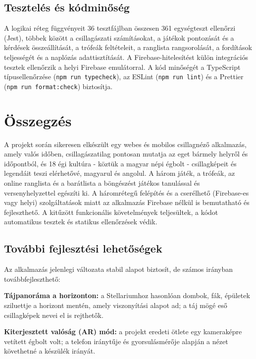 \documentclass[12pt,a4paper]{article}
\newcommand{\kod}[1]{\texttt{\small #1}}
\begin{document}
\subsection{Tesztelés és kódminőség}

A logikai réteg függvényeit 36 tesztfájlban összesen 361 egységteszt ellenőrzi (Jest), többek
között a csillagászati számításokat, a játékok pontozását és a kérdések összeállítását, a
trófeák feltételeit, a ranglista rangsorolását, a fordítások teljességét és a naplózás
adattisztítását. A Firebase-hitelesítést külön integrációs tesztek ellenőrzik a helyi Firebase
emulátorral. A kód minőségét a TypeScript típusellenőrzése (\kod{npm run typecheck}), az ESLint
(\kod{npm run lint}) és a Prettier (\kod{npm run format:check}) biztosítja.

\section{Összegzés}

A projekt során sikeresen elkészült egy webes és mobilos csillagnéző alkalmazás, amely
valós időben, csillagászatilag pontosan mutatja az eget bármely helyről és időpontból, és 18 égi
kultúra - köztük a magyar népi égbolt - csillagképeit és legendáit teszi elérhetővé, magyarul
és angolul. A három játék, a trófeák, az online ranglista és a barátlista a böngészést játékos
tanulással és versenyhelyzettel egészíti ki. A háromrétegű felépítés és a cserélhető
(Firebase-es vagy helyi) szolgáltatások miatt az alkalmazás Firebase nélkül is bemutatható és
fejleszthető. A kitűzött funkcionális követelmények teljesültek, a kódot automatikus tesztek és
statikus ellenőrzések védik.

\subsection{További fejlesztési lehetőségek}

Az alkalmazás jelenlegi változata stabil alapot biztosít, de számos irányban továbbfejleszthető:

\textbf{Tájpanoráma a horizonton:} a Stellariumhoz hasonlóan dombok, fák, épületek sziluettje a
horizont mentén, amely viszonyítási alapot ad; a táj mögé eső csillagképek nevei el is
rejthetők.

\textbf{Kiterjesztett valóság (AR) mód:} a projekt eredeti ötlete egy kameraképre vetített
égbolt volt; a telefon iránytűje és gyorsulásmérője alapján a nézet követhetné a készülék
irányát.
\end{document}
